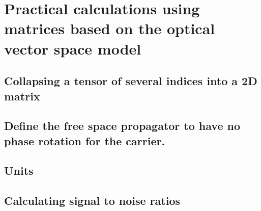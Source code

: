 \chapter{Practical calculations using matrices based on the optical vector space model}

\section{Collapsing a tensor of several indices into a 2D matrix}





\section{Define the free space propagator to have no phase rotation for the  carrier.}


\section{Units}


\section{Calculating signal to noise ratios}

